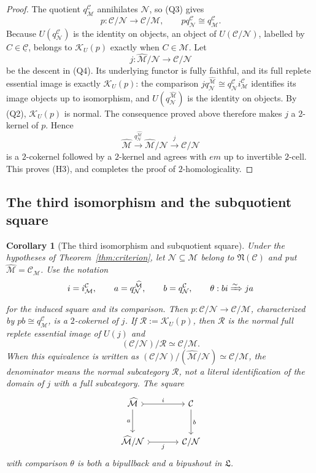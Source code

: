 \documentclass[11pt,reqno,a4paper]{amsart}
\newtheorem{corollary}[theorem]{Corollary}
\theoremstyle{definition}
\theoremstyle{remark}
\newcommand{\C}{\mathcal{C}}
\newcommand{\M}{\mathcal{M}}
\newcommand{\N}{\mathcal{N}}
\newcommand{\0}{\mathbf{0}}
\renewcommand{\1}{\mathbf{1}}
\newcommand{\iso}{\cong}
\newcommand{\Lcat}{\mathfrak L}
\begin{document}
\begin{proof}
The quotient $q_{\M}^{\C}$ annihilates $\N$, so (Q3) gives
\[
 p:\C/\N\longrightarrow\C/\M,
 \qquad p q_{\N}^{\C}\iso q_{\M}^{\C}.
\]
Because $U(q_{\N}^{\C})$ is the identity on objects,
an object of $U(\C/\N)$, labelled by
$C\in\underline{\C}$, belongs to $\mathcal{K}_U(p)$
exactly when $C\in\M$.
Let
\[
 j:\widehat{\M}/\N\longrightarrow\C/\N
\]
be the descent in (Q4). Its underlying functor is fully faithful,
and its full replete essential image is exactly
$\mathcal{K}_U(p)$: the comparison
$j q_{\N}^{\widehat{\M}}\iso q_{\N}^{\C}i_{\M}^{\C}$
identifies its image objects up to isomorphism, and
$U(q_{\N}^{\widehat{\M}})$ is the identity on objects.
By (Q2), $\mathcal{K}_U(p)$ is normal. The consequence proved
above therefore makes $j$ a $2$-kernel of $p$.
Hence
\begin{equation}\label{eq:generalhomology}
 \widehat{\M}\xrightarrow{q_{\N}^{\widehat{\M}}}
 \widehat{\M}/\N\xrightarrow{j}\C/\N
\end{equation}
is a $2$-cokernel followed by a $2$-kernel and agrees with $em$
up to invertible $2$-cell. This proves (H3), and completes the
proof of $2$-homologicality.
\end{proof}

\subsection{The third isomorphism and the subquotient square}

\begin{corollary}[The third isomorphism and subquotient square]\label{cor:third}
Under the hypotheses of Theorem~\ref{thm:criterion}, let
$\N\subseteq\M$ belong to $\mathfrak{N}(\C)$ and put
$\widehat{\M}=\C_{\M}$. Use the notation
\[
 i=i_{\M}^{\C},\qquad
 a=q_{\N}^{\widehat{\M}},\qquad
 b=q_{\N}^{\C},
 \qquad \theta:bi\xRightarrow{\sim}ja
\]
for the induced square and its comparison. Then
$p:\C/\N\to\C/\M$, characterized by
$pb\iso q_{\M}^{\C}$, is a $2$-cokernel of $j$.
If $\mathcal{R}:=\mathcal{K}_U(p)$, then $\mathcal{R}$ is
the normal full replete essential image of $U(j)$ and
\begin{equation}\label{eq:third}
 (\C/\N)/\mathcal{R}\simeq\C/\M.
\end{equation}
When this equivalence is written as
$(\C/\N)/(\widehat{\M}/\N)\simeq\C/\M$, the denominator
means the normal subcategory $\mathcal{R}$, not a literal
identification of the domain of $j$ with a full subcategory.
The square
\begin{equation}\label{eq:subquotientsquare}
\begin{tikzcd}[column sep=large,row sep=large]
 \widehat{\M} \arrow[r,tail,"i"] \arrow[d,"a"'] &
 \C \arrow[d,"b"] \\
 \widehat{\M}/\N \arrow[r,tail,"j"'] & \C/\N
\end{tikzcd}
\end{equation}
with comparison $\theta$ is both a bipullback and a bipushout
in $\Lcat$.
\end{corollary}
\end{document}
